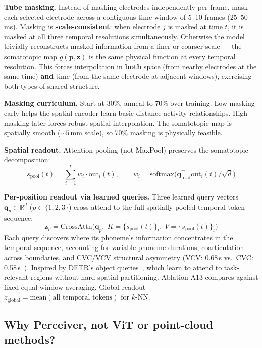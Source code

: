 \documentclass[11pt,letterpaper]{article}
\newcommand{\bfp}{\mathbf{p}}
\newcommand{\bfz}{\mathbf{z}}
\newcommand{\R}{\mathbb{R}}
\begin{document}
\textbf{Tube masking.} Instead of masking electrodes independently per frame, mask each selected electrode across a contiguous time window of 5--10 frames ($25$--$50$\,ms). Masking is \textbf{scale-consistent}: when electrode $j$ is masked at time $t$, it is masked at all three temporal resolutions simultaneously. Otherwise the model trivially reconstructs masked information from a finer or coarser scale --- the somatotopic map $g(\bfp, \bfz)$ is the same physical function at every temporal resolution. This forces interpolation in \textbf{both} space (from nearby electrodes at the same time) \textbf{and} time (from the same electrode at adjacent windows), exercising both types of shared structure.

\textbf{Masking curriculum.} Start at 30\%, anneal to 70\% over training. Low masking early helps the spatial encoder learn basic distance-activity relationships. High masking later forces robust spatial interpolation. The somatotopic map is spatially smooth (${\sim}5$\,mm scale), so 70\% masking is physically feasible.

\textbf{Spatial readout.} Attention pooling (not MaxPool) preserves the somatotopic decomposition:
\begin{equation}
s_{\text{pool}}(t) = \sum_{i=1}^{L} w_i \cdot \text{out}_i(t), \qquad w_i = \text{softmax}\bigl(\mathbf{q}_{\text{read}}^\top \text{out}_i(t) / \sqrt{d}\bigr)
\end{equation}

\textbf{Per-position readout via learned queries.} Three learned query vectors $\mathbf{q}_p \in \R^d$ ($p \in \{1,2,3\}$) cross-attend to the full spatially-pooled temporal token sequence:
\begin{equation}
\bfz_p = \text{CrossAttn}\bigl(\mathbf{q}_p,\; K{=}\{s_{\text{pool}}(t)\}_{t},\; V{=}\{s_{\text{pool}}(t)\}_{t}\bigr)
\end{equation}
Each query discovers where its phoneme's information concentrates in the temporal sequence, accounting for variable phoneme durations, coarticulation across boundaries, and CVC/VCV structural asymmetry (VCV: 0.68\,s vs.\ CVC: 0.58\,s~\cite{duraivel2025}). Inspired by DETR's object queries~\cite{carion2020}, which learn to attend to task-relevant regions without hard spatial partitioning. Ablation A13 compares against fixed equal-window averaging. Global readout $z_{\text{global}} = \text{mean}(\text{all temporal tokens})$ for $k$-NN.


\subsection{Why Perceiver, not ViT or point-cloud methods?}
\end{document}
